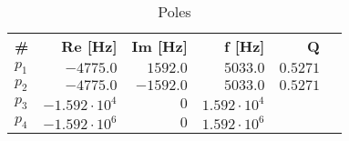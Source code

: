 \begin{table}[H]
\centering
\begin{tabular}[c]{lrrrrr}
\textbf{\#} & \textbf{Re [Hz]} & \textbf{Im [Hz]} & \textbf{f [Hz]} & \textbf{Q} \\ 
\rowcolor{myyellow}
$p_{1}$ &$-4775.0$ &$1592.0$ &$5033.0$ &$0.5271$ \\ 
$p_{2}$ &$-4775.0$ &$-1592.0$ &$5033.0$ &$0.5271$ \\ 
\rowcolor{myyellow}
$p_{3}$ &$-1.592 \cdot 10^{4}$ &$0$ &$1.592 \cdot 10^{4}$ \\ 
$p_{4}$ &$-1.592 \cdot 10^{6}$ &$0$ &$1.592 \cdot 10^{6}$ \\ 
\end{tabular}
\caption{Poles}
\end{table}

